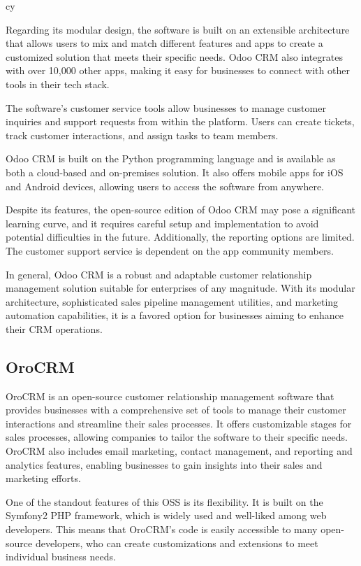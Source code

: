 cy\documentclass{article}
\begin{document}
Regarding its modular design, the software is built on an extensible architecture that allows users to mix and match different features and apps to create a customized solution that meets their specific needs. Odoo CRM also integrates with over 10,000 other apps, making it easy for businesses to connect with other tools in their tech stack.

The software's customer service tools allow businesses to manage customer inquiries and support requests from within the platform. Users can create tickets, track customer interactions, and assign tasks to team members.

Odoo CRM is built on the Python programming language and is available as both a cloud-based and on-premises solution. It also offers mobile apps for iOS and Android devices, allowing users to access the software from anywhere.

Despite its features, the open-source edition of Odoo CRM may pose a significant learning curve, and it requires careful setup and implementation to avoid potential difficulties in the future. Additionally, the reporting options are limited. The customer support service is dependent on the app community members.

In general, Odoo CRM is a robust and adaptable customer relationship management solution suitable for enterprises of any magnitude. With its modular architecture, sophisticated sales pipeline management utilities, and marketing automation capabilities, it is a favored option for businesses aiming to enhance their CRM operations.

\subsection{OroCRM}

OroCRM is an open-source customer relationship management software that provides businesses with a comprehensive set of tools to manage their customer interactions and streamline their sales processes. It offers customizable stages for sales processes, allowing companies to tailor the software to their specific needs. OroCRM also includes email marketing, contact management, and reporting and analytics features, enabling businesses to gain insights into their sales and marketing efforts.

One of the standout features of this OSS is its flexibility. It is built on the Symfony2 PHP framework, which is widely used and well-liked among web developers. This means that OroCRM's code is easily accessible to many open-source developers, who can create customizations and extensions to meet individual business needs.
\end{document}
